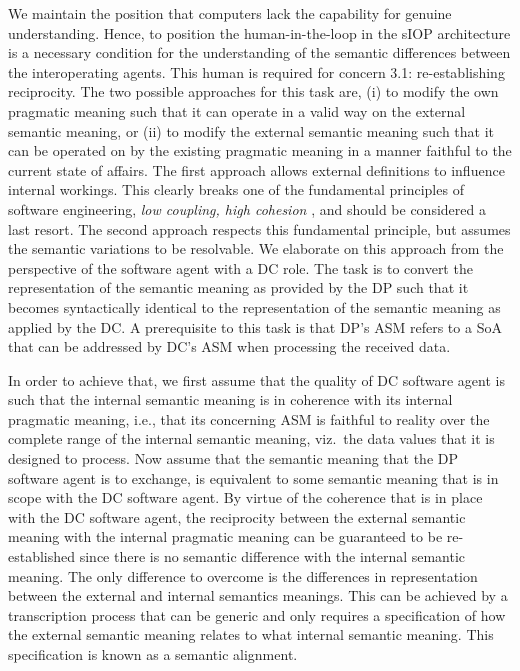 \documentclass[sort&compress,preprint,authoryear,3p,twocolumn]{elsarticle}
\begin{document}
We maintain the position that computers lack the capability for genuine
understanding. Hence, to position the human-in-the-loop in the sIOP
architecture is a necessary condition for the understanding of the
semantic differences between the interoperating agents. This human is
required for concern 3.1: re-establishing reciprocity. The two possible
approaches for this task are, (i) to modify the own pragmatic meaning
such that it can operate in a valid way on the external semantic
meaning, or (ii) to modify the external semantic meaning such that it
can be operated on by the existing pragmatic meaning in a manner
faithful to the current state of affairs. The first approach allows
external definitions to influence internal workings. This clearly breaks
one of the fundamental principles of software engineering, \emph{low
coupling, high cohesion} \citep[e.g.,][]{Hitz1995}, and should be
considered a last resort. The second approach respects this fundamental
principle, but assumes the semantic variations to be resolvable. We
elaborate on this approach from the perspective of the software agent
with a DC role. The task is to convert the representation of the
semantic meaning as provided by the DP such that it becomes
syntactically identical to the representation of the semantic meaning as
applied by the DC. A prerequisite to this task is that DP's ASM refers
to a SoA that can be addressed by DC's ASM when processing the received
data.

In order to achieve that, we first assume that the quality of DC
software agent is such that the internal semantic meaning is in
coherence with its internal pragmatic meaning, i.e., that its concerning
ASM is faithful to reality over the complete range of the internal
semantic meaning, viz.~the data values that it is designed to process.
Now assume that the semantic meaning that the DP software agent is to
exchange, is equivalent to some semantic meaning that is in scope with
the DC software agent. By virtue of the coherence that is in place with
the DC software agent, the reciprocity between the external semantic
meaning with the internal pragmatic meaning can be guaranteed to be
re-established since there is no semantic difference with the internal
semantic meaning. The only difference to overcome is the differences in
representation between the external and internal semantics meanings.
This can be achieved by a transcription process that can be generic and
only requires a specification of how the external semantic meaning
relates to what internal semantic meaning. This specification is known
as a semantic alignment.
\end{document}
